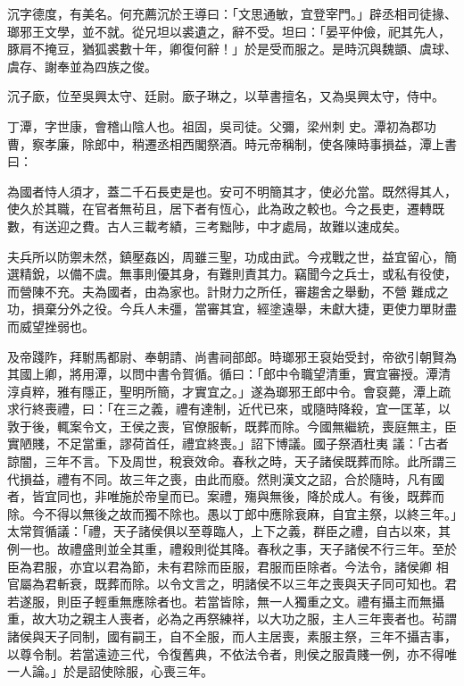 \begin{pinyinscope}
 沉字德度，有美名。何充薦沉於王導曰：「文思通敏，宜登宰門。」辟丞相司徒掾、瑯邪王文學，並不就。從兄坦以裘遺之，辭不受。坦曰：「晏平仲儉，祀其先人，豚肩不掩豆，猶狐裘數十年，卿復何辭！」於是受而服之。是時沉與魏顗、虞球、虞存、謝奉並為四族之俊。



 沉子廞，位至吳興太守、廷尉。廞子琳之，以草書擅名，又為吳興太守，侍中。



 丁潭，字世康，會稽山陰人也。祖固，吳司徒。父彌，梁州刺
 史。潭初為郡功曹，察孝廉，除郎中，稍遷丞相西閣祭酒。時元帝稱制，使各陳時事損益，潭上書曰：



 為國者恃人須才，蓋二千石長吏是也。安可不明簡其才，使必允當。既然得其人，使久於其職，在官者無茍且，居下者有恆心，此為政之較也。今之長吏，遷轉既數，有送迎之費。古人三載考績，三考黜陟，中才處局，故難以速成矣。



 夫兵所以防禦未然，鎮壓姦凶，周雖三聖，功成由武。今戎戰之世，益宜留心，簡選精銳，以備不虞。無事則優其身，有難則責其力。竊聞今之兵士，或私有役使，而營陳不充。夫為國者，由為家也。計財力之所任，審趨舍之舉動，不營
 難成之功，損棄分外之役。今兵人未彊，當審其宜，經塗遠舉，未獻大捷，更使力單財盡而威望挫弱也。



 及帝踐阼，拜駙馬都尉、奉朝請、尚書祠部郎。時瑯邪王裒始受封，帝欲引朝賢為其國上卿，將用潭，以問中書令賀循。循曰：「郎中令職望清重，實宜審授。潭清淳貞粹，雅有隱正，聖明所簡，才實宜之。」遂為瑯邪王郎中令。會裒薨，潭上疏求行終喪禮，曰：「在三之義，禮有達制，近代已來，或隨時降殺，宜一匡革，以敦于後，輒案令文，王侯之喪，官僚服斬，既葬而除。今國無繼統，喪庭無主，臣實陋賤，不足當重，謬荷首任，禮宜終喪。」詔下博議。國子祭酒杜夷
 議：「古者諒闇，三年不言。下及周世，稅衰效命。春秋之時，天子諸侯既葬而除。此所謂三代損益，禮有不同。故三年之喪，由此而廢。然則漢文之詔，合於隨時，凡有國者，皆宜同也，非唯施於帝皇而已。案禮，殤與無後，降於成人。有後，既葬而除。今不得以無後之故而獨不除也。愚以丁郎中應除衰麻，自宜主祭，以終三年。」太常賀循議：「禮，天子諸侯俱以至尊臨人，上下之義，群臣之禮，自古以來，其例一也。故禮盛則並全其重，禮殺則從其降。春秋之事，天子諸侯不行三年。至於臣為君服，亦宜以君為節，未有君除而臣服，君服而臣除者。今法令，諸侯卿
 相官屬為君斬衰，既葬而除。以令文言之，明諸侯不以三年之喪與天子同可知也。君若遂服，則臣子輕重無應除者也。若當皆除，無一人獨重之文。禮有攝主而無攝重，故大功之親主人喪者，必為之再祭練祥，以大功之服，主人三年喪者也。茍謂諸侯與天子同制，國有嗣王，自不全服，而人主居喪，素服主祭，三年不攝吉事，以尊令制。若當遠迹三代，令復舊典，不依法令者，則侯之服貴賤一例，亦不得唯一人論。」於是詔使除服，心喪三年。




\end{pinyinscope}
